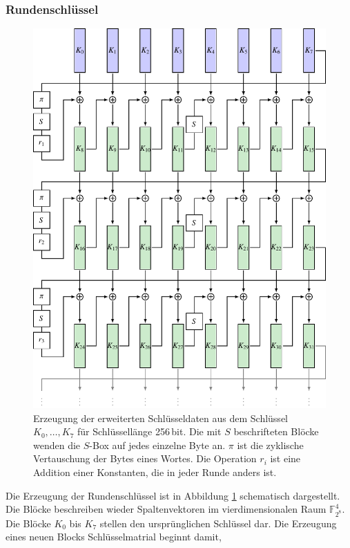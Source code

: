 \subsubsection{Rundenschlüssel}
\begin{figure}
\centering
\includegraphics{chapters/90-crypto/images/keys.pdf}
\caption{Erzeugung der erweiterten Schlüsseldaten aus dem Schlüssel
$K_0,\dots,K_7$ für Schlüssellänge 256\,bit.
Die mit $S$ beschrifteten Blöcke wenden die $S$-Box auf jedes einzelne
Byte an.
$\pi$ ist die zyklische Vertauschung der Bytes eines Wortes.
Die Operation $r_i$ ist eine Addition einer Konstanten, die in jeder
Runde anders ist.
\label{buch:crypto:fig:keys}}
\end{figure}
Die Erzeugung der Rundenschlüssel ist in Abbildung
\ref{buch:crypto:fig:keys}
schematisch dargestellt.
Die Blöcke beschreiben wieder Spaltenvektoren im vierdimensionalen
Raum $\mathbb{F}_{2^8}^4$.
Die Blöcke $K_0$ bis $K_7$ stellen den ursprünglichen Schlüssel dar.
Die Erzeugung eines neuen Blocks Schlüsselmatrial beginnt damit,
